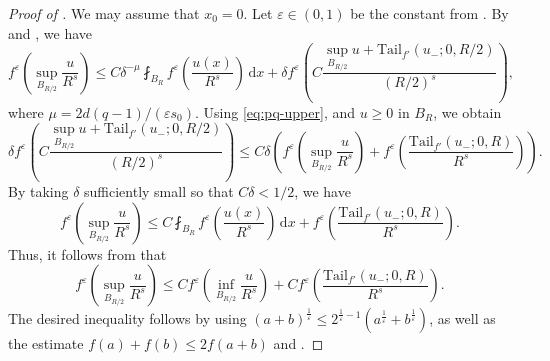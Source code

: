 \documentclass[11pt]{amsart}
\theoremstyle{plain}
\theoremstyle{definition}
\numberwithin{equation}{section}
\newcommand{\dx} {\,\mathrm{d}x}
\begin{document}
\begin{proof} [Proof of ]
We may assume that $x_0=0$. Let $\varepsilon \in (0,1)$ be the constant from . By  and , we have
\begin{equation*}
f^{\varepsilon} \left( \sup_{B_{R/2}} \frac{u}{R^s} \right) \leq C \delta^{-\mu} \fint_{B_{R}} f^{\varepsilon} \left( \frac{u(x)}{R^s} \right) \dx + \delta f^{\varepsilon} \left( C \frac{\sup_{B_{R/2}}u + \mathrm{Tail}_{f'}(u_-; 0, R/2)}{(R/2)^s} \right),
\end{equation*}
where $\mu = 2d(q-1)/(\varepsilon s_0)$. Using \eqref{eq:pq-upper},  and $u\geq 0$ in $B_R$, we obtain
\begin{equation*}
\delta f^{\varepsilon} \left( C \frac{\sup_{B_{R/2}}u + \mathrm{Tail}_{f'}(u_-; 0, R/2)}{(R/2)^s} \right) \leq C\delta \left( f^{\varepsilon} \left( \sup_{B_{R/2}} \frac{u}{R^s} \right) + f^{\varepsilon} \left( \frac{\mathrm{Tail}_{f'}(u_-; 0, R)}{R^s} \right) \right).
\end{equation*}
By taking $\delta$ sufficiently small so that $C \delta < 1/2$, we have
\begin{equation*}
f^{\varepsilon} \left( \sup_{B_{R/2}} \frac{u}{R^s} \right) \leq C \fint_{B_{R}} f^{\varepsilon} \left( \frac{u(x)}{R^s} \right) \dx + f^{\varepsilon} \left( \frac{\mathrm{Tail}_{f'}(u_-; 0, R)}{R^s} \right).
\end{equation*}
Thus, it follows from  that
\begin{equation*}
f^{\varepsilon} \left( \sup_{B_{R/2}} \frac{u}{R^s} \right) \leq C f^{\varepsilon} \left( \inf_{B_{R/2}} \frac{u}{R^s} \right) + Cf^{\varepsilon} \left( \frac{\mathrm{Tail}_{f'}(u_-; 0, R)}{R^s} \right).
\end{equation*}
The desired inequality follows by using $(a+b)^{\frac{1}{\varepsilon}} \leq 2^{\frac{1}{\varepsilon}-1}(a^{\frac{1}{\varepsilon}} + b^{\frac{1}{\varepsilon}})$, as well as the estimate $f(a) + f(b) \le 2 f(a+b)$ and .
\end{proof}
\end{document}
